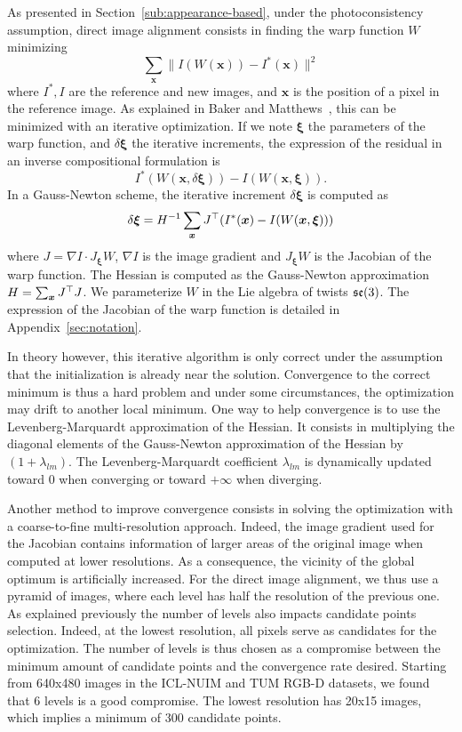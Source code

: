 As presented in Section~\ref{sub:appearance-based},
under the photoconsistency assumption, direct image alignment consists
in finding the warp function $W$ minimizing
\[
	\sum_{\bm{x}}\|I(W(\bm{x})) - I^{*}(\bm{x})\|^2
\]
where $I^{*}, I$ are the reference and new images,
and $\bm{x}$ is the position of a pixel in the reference image.
As explained in Baker and Matthews~\cite{baker2004lucas},
this can be minimized with an iterative optimization.
If we note $\bm{\xi}$ the parameters of the warp function,
and $\delta\bm{\xi}$ the iterative increments,
the expression of the residual in an inverse compositional formulation is
\[
	I^{*}(W(\bm{x}, \delta \bm{\xi})) - I(W(\bm{x}, \bm{\xi})).
\]
In a Gauss-Newton scheme, the iterative increment $\delta\bm{\xi}$ is computed as
\[
	\delta \bm{\xi} = H^{-1} \sum_{\bm{x}} J^{\top} (I^{*}(\bm{x}) - I(W(\bm{x}, \bm{\xi})))
\]
where $J = \nabla I \cdot J_{\bm{\xi}}W$, $\nabla I$ is the image gradient
and $J_{\bm{\xi}}W$ is the Jacobian of the warp function.
The Hessian is computed as the Gauss-Newton approximation
$H = \sum_{\bm{x}}J^{\top}J$.
We parameterize $W$ in the Lie algebra of twists $\mathfrak{se}(3)$.
The expression of the Jacobian of the warp function
is detailed in Appendix~\ref{sec:notation}.

In theory however, this iterative algorithm is only correct under the assumption
that the initialization is already near the solution.
Convergence to the correct minimum is thus a hard problem
and under some circumstances, the optimization may drift to another local minimum.
One way to help convergence is to use the Levenberg-Marquardt approximation
of the Hessian.
It consists in multiplying the diagonal elements of
the Gauss-Newton approximation of the Hessian by $(1 + \lambda_{lm})$.
The Levenberg-Marquardt coefficient $\lambda_{lm}$ is dynamically
updated toward 0 when converging or toward $+\infty$ when diverging.

Another method to improve convergence consists in solving the optimization
with a coarse-to-fine multi-resolution approach.
Indeed, the image gradient used for the Jacobian contains information
of larger areas of the original image when computed at lower resolutions.
As a consequence, the vicinity of the global optimum is artificially increased.
For the direct image alignment, we thus use a pyramid of images,
where each level has half the resolution of the previous one.
As explained previously the number of levels also impacts candidate points selection.
Indeed, at the lowest resolution, all pixels serve as candidates for the optimization.
The number of levels is thus chosen as a compromise between the minimum amount
of candidate points and the convergence rate desired.
Starting from 640x480 images in the ICL-NUIM and TUM RGB-D datasets,
we found that 6 levels is a good compromise.
The lowest resolution has 20x15 images, which implies a minimum of 300 candidate points.

